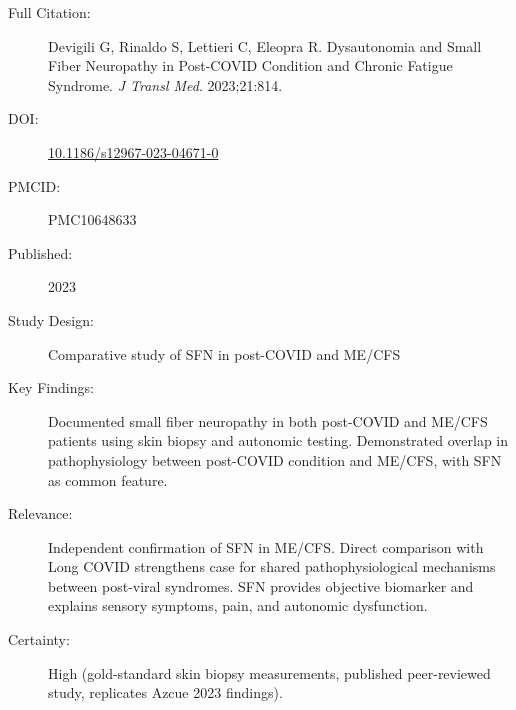 \begin{description}
    \item[Full Citation:] Devigili G, Rinaldo S, Lettieri C, Eleopra R. Dysautonomia and Small Fiber Neuropathy in Post-COVID Condition and Chronic Fatigue Syndrome. \textit{J Transl Med}. 2023;21:814.
    \item[DOI:] \href{https://doi.org/10.1186/s12967-023-04671-0}{10.1186/s12967-023-04671-0}
    \item[PMCID:] PMC10648633
    \item[Published:] 2023
    \item[Study Design:] Comparative study of SFN in post-COVID and ME/CFS
    \item[Key Findings:] Documented small fiber neuropathy in both post-COVID and ME/CFS patients using skin biopsy and autonomic testing. Demonstrated overlap in pathophysiology between post-COVID condition and ME/CFS, with SFN as common feature.
    \item[Relevance:] Independent confirmation of SFN in ME/CFS. Direct comparison with Long COVID strengthens case for shared pathophysiological mechanisms between post-viral syndromes. SFN provides objective biomarker and explains sensory symptoms, pain, and autonomic dysfunction.
    \item[Certainty:] High (gold-standard skin biopsy measurements, published peer-reviewed study, replicates Azcue 2023 findings).
\end{description}

